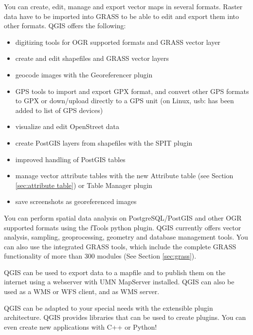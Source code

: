 
You can create, edit, manage and export vector maps in several formats. Raster data
have to be imported into GRASS to be able to edit and export them into other
formats. QGIS offers the following: 

\begin{itemize}
\item digitizing tools for OGR supported formats and GRASS vector layer
\item create and edit shapefiles and GRASS vector layers
\item geocode images with the Georeferencer plugin
\item GPS tools to import and export GPX format, and convert other GPS
formats to GPX or down/upload directly to a GPS unit (on Linux, usb: has been added to list of GPS devices)
\item visualize and edit OpenStreet data
\item create PostGIS layers from shapefiles with the SPIT plugin 
\item improved handling of PostGIS tables
\item manage vector attribute tables with the new Attribute table (see Section 
\ref{sec:attribute table}) or Table Manager plugin
\item save screenshots as georeferenced images
\end{itemize}


You can perform spatial data analysis on PostgreSQL/PostGIS and other OGR
supported formats using the fTools python plugin. QGIS currently offers
vector analysis, sampling, geoprocessing, geometry and database management
tools. You can also use the integrated GRASS tools, which 
include the complete GRASS functionality of more than 300 modules (See
Section \ref{sec:grass}).


QGIS can be used to export data to a mapfile and to publish them on the
internet using a webserver with UMN MapServer installed. QGIS can also
be used as a WMS or WFS client, and as WMS server. 


QGIS can be adapted to your special needs with the extensible
plugin architecture. QGIS provides libraries that can be used to create
plugins.  You can even create new applications with C++ or Python!

